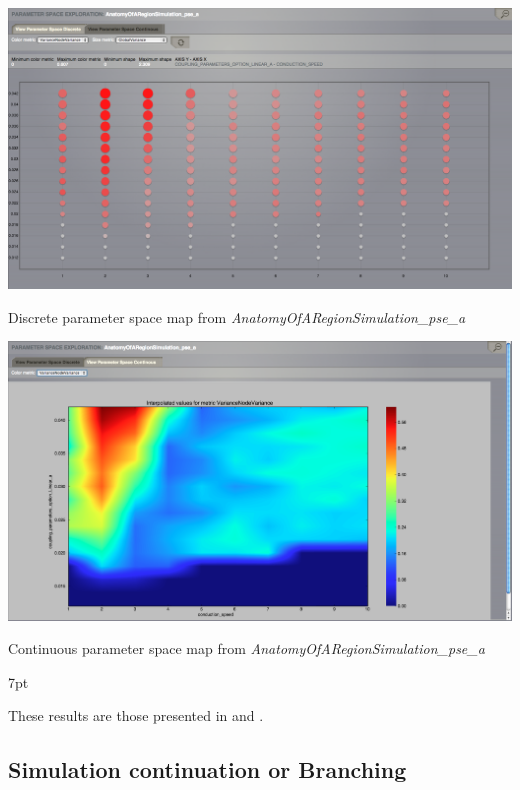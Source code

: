 \documentclass{tufte-handout}
\newenvironment{blah}{%
  \def\FrameCommand{%
    \hspace{1pt}%
    {\color{DarkOrange}\vrule width 2pt}%
    {\color{PeachPuff}\vrule width 4pt}%
    \colorbox{PeachPuff}%
  }%
  \MakeFramed{\advance\hsize-\width\FrameRestore}%
  \noindent\hspace{-4.55pt}%
  \begin{adjustwidth}{}{7pt}%
  \vspace{2pt}\vspace{2pt}%
}
{%
  \vspace{2pt}\end{adjustwidth}\endMakeFramed%
}
\begin{document}
\begin{marginfigure}
  \includegraphics[width=\linewidth]{Handout_UI_BuildingYourOwnBrainNetworkModel_PSEDiscrete}%
  \caption{Discrete parameter space map from \textit{AnatomyOfARegionSimulation\_pse\_a}}%
  \label{fig:pse_discrete}%
\end{marginfigure}

\begin{marginfigure}
  \includegraphics[width=\linewidth]{Handout_UI_BuildingYourOwnBrainNetworkModel_PSEContinuous}%
  \caption{Continuous parameter space map from \textit{AnatomyOfARegionSimulation\_pse\_a}}%
  \label{fig:pse_continuous}%
\end{marginfigure}


\begin{blah}
 These results are those presented in \citep{Ghosh_2008} and \citep{Knock_2009}. 
\end{blah}

\subsection{Simulation continuation or Branching}\label{sec:results}
\end{document}
